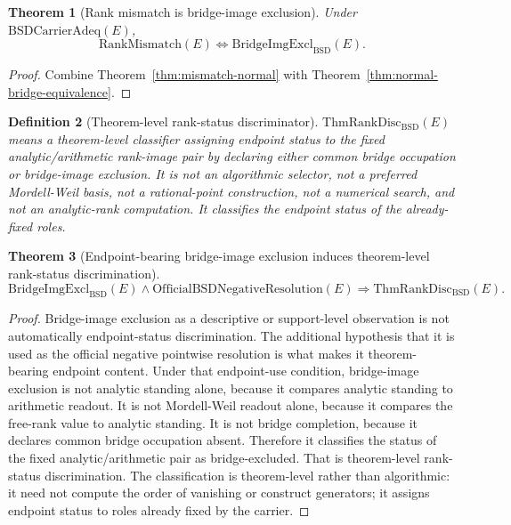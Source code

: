 \documentclass[11pt]{article}
\newtheorem{theorem}{Theorem}[section]
\newtheorem{definition}[theorem]{Definition}
\newcommand{\BSD}{\mathrm{BSD}}
\newcommand{\RankMismatch}{\mathrm{RankMismatch}}
\newcommand{\BridgeImgExcl}{\mathrm{BridgeImgExcl}_{\BSD}}
\newcommand{\ThmRankDisc}{\mathrm{ThmRankDisc}_{\BSD}}
\begin{document}
\begin{theorem}[Rank mismatch is bridge-image exclusion]\label{thm:mismatch-bridge-exclusion}
Under $\mathrm{BSDCarrierAdeq}(E)$,
\[
\RankMismatch(E)\Longleftrightarrow \BridgeImgExcl(E).
\]
\end{theorem}

\begin{proof}
Combine Theorem~\ref{thm:mismatch-normal} with Theorem~\ref{thm:normal-bridge-equivalence}.
\end{proof}

\begin{definition}[Theorem-level rank-status discriminator]
$\ThmRankDisc(E)$ means a theorem-level classifier assigning endpoint status to the fixed analytic/arithmetic rank-image pair by declaring either common bridge occupation or bridge-image exclusion. It is not an algorithmic selector, not a preferred Mordell-Weil basis, not a rational-point construction, not a numerical search, and not an analytic-rank computation. It classifies the endpoint status of the already-fixed roles.
\end{definition}

\begin{theorem}[Endpoint-bearing bridge-image exclusion induces theorem-level rank-status discrimination]\label{thm:bridge-exclusion-disc}
\[
\BridgeImgExcl(E)\wedge \mathrm{OfficialBSDNegativeResolution}(E)
\Rightarrow \ThmRankDisc(E).
\]
\end{theorem}

\begin{proof}
Bridge-image exclusion as a descriptive or support-level observation is not automatically endpoint-status discrimination. The additional hypothesis that it is used as the official negative pointwise resolution is what makes it theorem-bearing endpoint content. Under that endpoint-use condition, bridge-image exclusion is not analytic standing alone, because it compares analytic standing to arithmetic readout. It is not Mordell-Weil readout alone, because it compares the free-rank value to analytic standing. It is not bridge completion, because it declares common bridge occupation absent. Therefore it classifies the status of the fixed analytic/arithmetic pair as bridge-excluded. That is theorem-level rank-status discrimination. The classification is theorem-level rather than algorithmic: it need not compute the order of vanishing or construct generators; it assigns endpoint status to roles already fixed by the carrier.
\end{proof}
\end{document}
